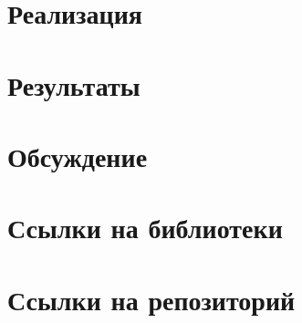 \documentclass[14pt,a4paper,article]{ncc}
\begin{document}
\section{Реализация}
\label{sec:impl}

\newpage

\section{Результаты}
\label{sec:result}





\newpage

\section{Обсуждение}
\label{sec:discuss}





\newpage

\section{Ссылки на библиотеки}
\label{sec:liter}

\newpage

\section{Ссылки на репозиторий}
\label{sec:rep}

\end{document}

